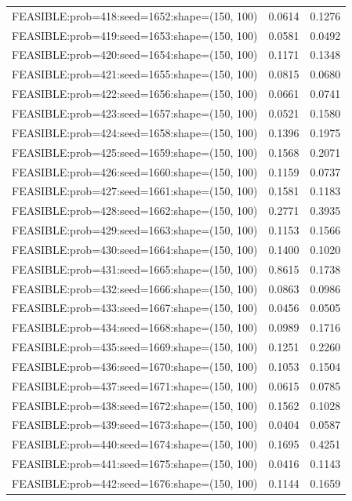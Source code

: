 \begin{longtable}{lcc}
FEASIBLE:prob=418:seed=1652:shape=(150, 100) &   0.0614 & 0.1276 \\
FEASIBLE:prob=419:seed=1653:shape=(150, 100) &   0.0581 & 0.0492 \\
FEASIBLE:prob=420:seed=1654:shape=(150, 100) &   0.1171 & 0.1348 \\
FEASIBLE:prob=421:seed=1655:shape=(150, 100) &   0.0815 & 0.0680 \\
FEASIBLE:prob=422:seed=1656:shape=(150, 100) &   0.0661 & 0.0741 \\
FEASIBLE:prob=423:seed=1657:shape=(150, 100) &   0.0521 & 0.1580 \\
FEASIBLE:prob=424:seed=1658:shape=(150, 100) &   0.1396 & 0.1975 \\
FEASIBLE:prob=425:seed=1659:shape=(150, 100) &   0.1568 & 0.2071 \\
FEASIBLE:prob=426:seed=1660:shape=(150, 100) &   0.1159 & 0.0737 \\
FEASIBLE:prob=427:seed=1661:shape=(150, 100) &   0.1581 & 0.1183 \\
FEASIBLE:prob=428:seed=1662:shape=(150, 100) &   0.2771 & 0.3935 \\
FEASIBLE:prob=429:seed=1663:shape=(150, 100) &   0.1153 & 0.1566 \\
FEASIBLE:prob=430:seed=1664:shape=(150, 100) &   0.1400 & 0.1020 \\
FEASIBLE:prob=431:seed=1665:shape=(150, 100) &   0.8615 & 0.1738 \\
FEASIBLE:prob=432:seed=1666:shape=(150, 100) &   0.0863 & 0.0986 \\
FEASIBLE:prob=433:seed=1667:shape=(150, 100) &   0.0456 & 0.0505 \\
FEASIBLE:prob=434:seed=1668:shape=(150, 100) &   0.0989 & 0.1716 \\
FEASIBLE:prob=435:seed=1669:shape=(150, 100) &   0.1251 & 0.2260 \\
FEASIBLE:prob=436:seed=1670:shape=(150, 100) &   0.1053 & 0.1504 \\
FEASIBLE:prob=437:seed=1671:shape=(150, 100) &   0.0615 & 0.0785 \\
FEASIBLE:prob=438:seed=1672:shape=(150, 100) &   0.1562 & 0.1028 \\
FEASIBLE:prob=439:seed=1673:shape=(150, 100) &   0.0404 & 0.0587 \\
FEASIBLE:prob=440:seed=1674:shape=(150, 100) &   0.1695 & 0.4251 \\
FEASIBLE:prob=441:seed=1675:shape=(150, 100) &   0.0416 & 0.1143 \\
FEASIBLE:prob=442:seed=1676:shape=(150, 100) &   0.1144 & 0.1659 \\

\end{longtable}
